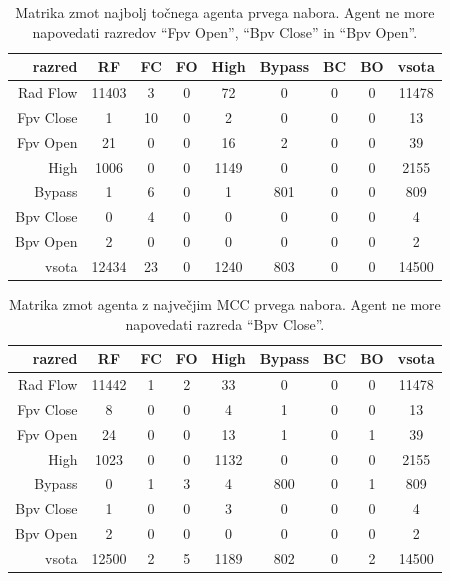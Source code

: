 \begin{table}[H]
    \centering
    \begin{tabular}{||rcccccccc||}
        \hline
        razred    & RF    & FC & FO & High & Bypass & BC & BO & vsota \\ \hline
        Rad Flow  & 11403 & 3  & 0  & 72   & 0      & 0  & 0  & 11478 \\ \hline
        Fpv Close & 1     & 10 & 0  & 2    & 0      & 0  & 0  & 13    \\ \hline
        Fpv Open  & 21    & 0  & 0  & 16   & 2      & 0  & 0  & 39    \\ \hline
        High      & 1006  & 0  & 0  & 1149 & 0      & 0  & 0  & 2155  \\ \hline
        Bypass    & 1     & 6  & 0  & 1    & 801    & 0  & 0  & 809   \\ \hline
        Bpv Close & 0     & 4  & 0  & 0    & 0      & 0  & 0  & 4     \\ \hline
        Bpv Open  & 2     & 0  & 0  & 0    & 0      & 0  & 0  & 2     \\ \hline
        vsota     & 12434 & 23 & 0  & 1240 & 803    & 0  & 0  & 14500 \\ \hline
    \end{tabular}
    \caption{Matrika zmot najbolj točnega agenta prvega nabora. Agent ne more napovedati razredov \enquote{Fpv Open}, \enquote{Bpv Close} in \enquote{Bpv Open}.}
    \label{tab:statlog_acc_1}
\end{table}

\begin{table}[H]
    \centering
    \begin{tabular}{||rcccccccc||}
        \hline
        razred    & RF    & FC & FO & High & Bypass & BC & BO & vsota \\ \hline
        Rad Flow  & 11442 & 1  & 2  & 33   & 0      & 0  & 0  & 11478 \\ \hline
        Fpv Close & 8     & 0  & 0  & 4    & 1      & 0  & 0  & 13    \\ \hline
        Fpv Open  & 24    & 0  & 0  & 13   & 1      & 0  & 1  & 39    \\ \hline
        High      & 1023  & 0  & 0  & 1132 & 0      & 0  & 0  & 2155  \\ \hline
        Bypass    & 0     & 1  & 3  & 4    & 800    & 0  & 1  & 809   \\ \hline
        Bpv Close & 1     & 0  & 0  & 3    & 0      & 0  & 0  & 4     \\ \hline
        Bpv Open  & 2     & 0  & 0  & 0    & 0      & 0  & 0  & 2     \\ \hline
        vsota     & 12500 & 2  & 5  & 1189 & 802    & 0  & 2  & 14500 \\ \hline
    \end{tabular}
    \caption{Matrika zmot agenta z največjim MCC prvega nabora. Agent ne more napovedati razreda \enquote{Bpv Close}.}
    \label{tab:statlog_mcc_1}
\end{table}

